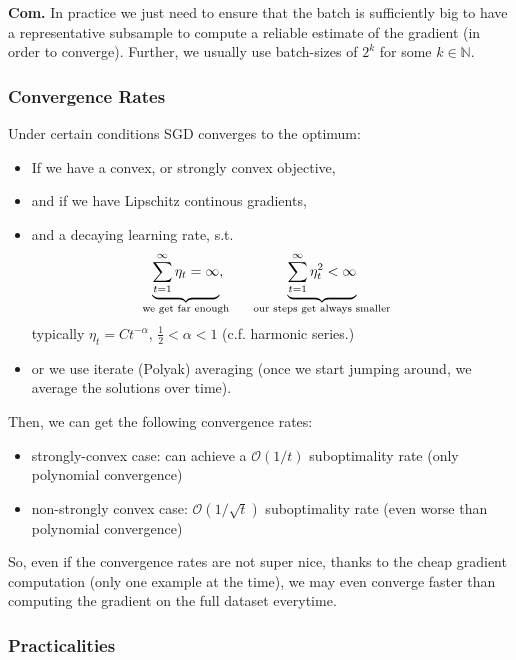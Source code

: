 \documentclass[a2paper,4pt]{extarticle}
\newcommand{\BigO}{\mathcal{O}}
\newcommand{\N}{\mathbb{N}}
\newcommand{\Com}{\textbf{Com.} }
\begin{document}
\begin{landscape}
\begin{multicols*}{7}
\Com In practice we just need to ensure that the batch is sufficiently big to
have a representative subsample to compute a reliable estimate of the gradient
(in order to converge). Further, we usually use batch-sizes of $2^k$ for some
$k\in\N$.

\subsubsection{Convergence Rates}

Under certain conditions SGD converges to the optimum:
\begin{itemize}
  \item If we have a convex, or strongly convex objective,
  \item and if we have Lipschitz continous gradients,
  \item and a decaying learning rate, s.t.
  \[
  \underbrace{\sum_{t=1}^\infty\eta_t=\infty}_{\mathclap{\text{we get far
  enough}}},
  \qquad
  \underbrace{\sum_{t=1}^\infty\eta_t^2<\infty}_{\text{our steps get always
  smaller}}
  \]
  typically $\eta_t=Ct^{-\alpha}$, $\frac{1}{2}<\alpha<1$ (c.f. harmonic
  series.)
  \item or we use iterate (Polyak) averaging (once we start jumping around, we
  average the solutions over time).
\end{itemize}
Then, we can get the following convergence rates:
\begin{itemize}
  \item strongly-convex case: can achieve a $\BigO(1/t)$ suboptimality rate
  (only polynomial convergence)
  \item non-strongly convex case: $\BigO(1/\sqrt{t})$ suboptimality rate (even
  worse than polynomial convergence)
\end{itemize}
So, even if the convergence rates are not super nice, thanks to the cheap
gradient computation (only one example at the time), we may even converge faster
than computing the gradient on the full dataset everytime.

\subsubsection{Practicalities}


\end{multicols*}
\end{landscape}
\end{document}
